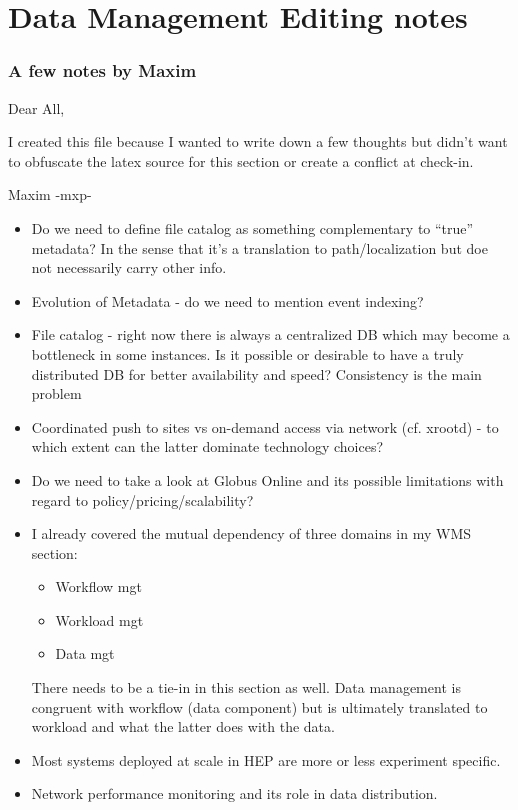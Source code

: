 \section{Data Management Editing notes}

\subsubsection{A few notes by Maxim}

Dear All,

I created this file because I wanted to write down a few thoughts but didn't want to obfuscate
the latex source for this section or create a conflict at check-in.

Maxim -mxp-

\begin{itemize}

\item Do we need to define file catalog as something complementary to ``true'' metadata? In the sense that it's a translation to path/localization but doe not necessarily carry other info.

\item Evolution of Metadata - do we need to mention event indexing?

\item File catalog - right now there is always a centralized DB which may become a bottleneck in some instances.
Is it possible or desirable to have a truly distributed DB for better availability and speed? Consistency is the main problem

\item Coordinated push to sites vs on-demand access via network (cf. xrootd) - to which extent can the latter dominate technology choices?

\item Do we need to take a look at Globus Online and its possible limitations with regard to policy/pricing/scalability?

\item I already covered the mutual dependency of three domains in my WMS section:
\begin{itemize}
\item Workflow mgt
\item Workload mgt
\item Data mgt
 \end{itemize}
 There needs to be a tie-in in this section as well. Data management is congruent with workflow (data component) but is ultimately
 translated to workload and what the latter does with the data.
 
 \item Most systems deployed at scale in HEP are more or less experiment specific.
 
 \item Network performance monitoring and its role in data distribution.
 
 \end{itemize}

